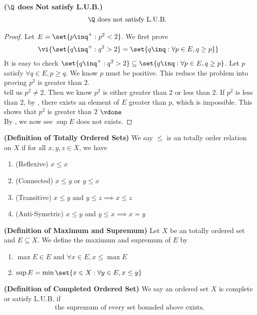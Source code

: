 \documentclass{report}
\begin{document}
\begin{corollary}
\label{1.1.4}
\textbf{($\Q$ does Not satisfy L.U.B.)} 
\begin{align*}
\Q\text{ does not satisfy L.U.B. }
\end{align*}
\end{corollary}
\begin{proof}
 Let $E=\set{p\inq^+:p^2<2}$. We first prove 
\begin{align*}
  \vi{\set{q\inq^+:q^2>2}=\set{q\inq:\forall p\in E,q\geq p}}
\end{align*}
It is easy to check $\set{q\inq^+:q^2>2}\subseteq \set{q\inq:\forall p\in E,q\geq p}$.  Let $p$ satisfy  $\forall q\in E,p\geq q$. We know $p$ must be positive. This reduce the problem into proving $p^2$ is greater than  $2$.\\

 tell us $p^2\neq 2$. Then we know $p^2$ is either greater than  $2$ or less than  $2$. If  $p^2$ is less than  $2$, by  , there exists an element of  $E$ greater than  $p$, which is impossible. This shows that  $p^2$ is greater than $2$ $\vdone$ \\

By , we now see $\sup E$ does not exists. \CaC
\end{proof}
\begin{definition}
\label{1.1.5}
\textbf{(Definition of Totally Ordered Sets)} We say $\leq $ is an totally order relation on $X$ if for all  $x,y,z \in X$, we have 
\begin{enumerate}[label=(\alph*)]
  \item (Reflexive) $x\leq x$
  \item (Connected) $x\leq y\text{ or }y\leq x$
  \item (Transitive) $x\leq y\text{ and }y\leq z \implies x\leq z$ 
  \item (Anti-Symetric) $x\leq y$ and $y\leq x\implies x=y$
\end{enumerate}
\end{definition}
\begin{definition}
\label{1.1.6}
\textbf{(Definition of Maximum and Supremum)} Let $X$ be an totally ordered set and $E\subseteq X$. We define the maximum and supremum of $E$ by  
\begin{enumerate}[label=(\alph*)]
  \item $\max E \in E\text{ and }\forall x\in E, x\leq \max E$
  \item $\sup E=\min \set{x\in X:\forall y\in E, x\leq y}$
\end{enumerate}
\end{definition}
\begin{definition}
\label{1.1.7}
\textbf{(Definition of Completed Ordered Set)} We say an ordered set $X$ is complete or satisfy L.U.B. if 
\begin{align*}
  \text{ the supremum of every set bounded above exists.}
\end{align*}
\end{definition}
\end{document}
